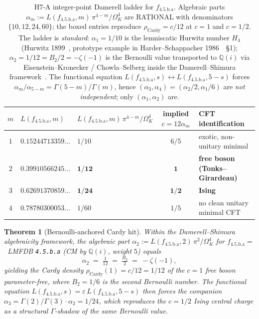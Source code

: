 \documentclass[a4paper,11pt]{article}
\newcommand{\OmK}{\Omega_K}
\newcommand{\fLM}{f_{\text{4.5.b.a}}}
\newcommand{\Qi}{\mathbb{Q}(i)}
\newtheorem{theorem}{Theorem}
\theoremstyle{definition}
\theoremstyle{remark}
\begin{document}
\begin{table}[ht]
\centering
\begin{tabular}{cllcl}
\toprule
$m$ & $L(\fLM,m)$ & $L(\fLM,m)\,\pi^{4-m}/\OmK^{4}$ &
implied $c=12\alpha_m$ & CFT identification \\
\midrule
$1$ & $0.15244713359\ldots$ & $1/10$ & $6/5$ &
exotic, non-unitary minimal\\
$2$ & $0.39910566245\ldots$ & $\bm{1/12}$ & $\bm{1}$ &
\textbf{free boson (Tonks--Girardeau)} \\
$3$ & $0.62691370859\ldots$ & $\bm{1/24}$ & $\bm{1/2}$ &
\textbf{Ising} \\
$4$ & $0.78780300053\ldots$ & $1/60$ & $1/5$ &
no clean unitary minimal CFT \\
\bottomrule
\end{tabular}
\caption{H7-A integer-point Damerell ladder for $\fLM$.  Algebraic
parts $\alpha_m := L(\fLM,m)\,\pi^{4-m}/\OmK^{4}$ are RATIONAL with
denominators $\{10,12,24,60\}$; the boxed entries reproduce
$\rho_{\mathrm{Cardy}}=c/12$ at $c=1$ and $c=1/2$.
The ladder is \emph{standard}: $\alpha_1 = 1/10$ is the
lemniscatic Hurwitz number $H_4$ (Hurwitz 1899~\cite{Hurwitz1899},
prototype example in Harder--Schappacher 1986~\cite{HS86}~\S 1);
$\alpha_2 = 1/12 = B_2/2 = -\zeta(-1)$ is the Bernoulli value
transported to $\Qi$ via Eisenstein--Kronecker / Chowla--Selberg
inside the Damerell--Shimura framework~\cite{Damerell71,Shimura76,ChowSel49}.
The functional equation $L(\fLM,s) \leftrightarrow L(\fLM,5-s)$
forces $\alpha_m/\alpha_{5-m} = \Gamma(5-m)/\Gamma(m)$, hence
$(\alpha_3,\alpha_4) = (\alpha_2/2, \alpha_1/6)$ are
\emph{not independent}; only $(\alpha_1,\alpha_2)$ are.}
\label{tab:ladder}
\end{table}

\begin{theorem}[Bernoulli-anchored Cardy hit]
\label{thm:hit}
Within the Damerell--Shimura algebraicity framework, the algebraic
part $\alpha_2 := L(\fLM,2)\,\pi^{2}/\OmK^{4}$ for $\fLM = $~LMFDB
\texttt{4.5.b.a} (CM by $\Qi$, weight $5$) equals
\begin{equation}
  \alpha_2 \;=\; \tfrac{1}{12} \;=\; \tfrac{B_2}{2} \;=\; -\zeta(-1),
\end{equation}
yielding the Cardy density $\rho_{\mathrm{Cardy}}(1) = c/12 = 1/12$
of the $c=1$ free boson \emph{parameter-free}, where $B_2 = 1/6$ is
the second Bernoulli number.  The functional equation
$L(\fLM,s) = \varepsilon\,L(\fLM,5-s)$ then forces the companion
$\alpha_3 = \Gamma(2)/\Gamma(3)\cdot\alpha_2 = 1/24$, which
reproduces the $c=1/2$ Ising central charge as a structural
$\Gamma$-shadow of the same Bernoulli value.
\end{theorem}
\end{document}
